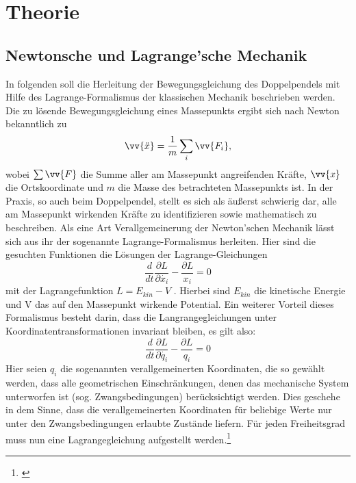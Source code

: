 \section{Theorie}
\subsection{Newtonsche und Lagrange'sche Mechanik}
In folgenden soll die Herleitung der Bewegungsgleichung des Doppelpendels mit Hilfe des Lagrange-Formalismus der klassischen Mechanik beschrieben werden. \\
Die zu lösende Bewegungsgleichung eines Massepunkts ergibt sich nach Newton bekanntlich zu \begin{equation}
\vv{\ddot{x}}=\frac{1}{m}\sum_i \vv{F_i},
\end{equation} 
wobei $ \sum \vv{F} $ die Summe aller am Massepunkt angreifenden Kräfte, $\vv{x} $ die Ortskoordinate und $ m $ die Masse des betrachteten Massepunkts ist.
In der Praxis, so auch beim Doppelpendel, stellt es sich als äußerst schwierig dar, alle am Massepunkt wirkenden Kräfte zu identifizieren sowie mathematisch zu beschreiben. Als eine Art Verallgemeinerung der Newton'schen Mechanik lässt sich aus ihr der sogenannte Lagrange-Formalismus herleiten. Hier sind die gesuchten Funktionen die Lösungen der Lagrange-Gleichungen
\begin{equation}
\frac{d}{dt}\frac{\partial L}{\partial\dot{x_i}}-\frac{\partial L}{x_i} = 0
\end{equation}
mit der Lagrangefunktion  $ L=E_{kin} - V $ . Hierbei sind $E_{kin}$ die kinetische Energie und V das auf den Massepunkt wirkende Potential. Ein weiterer Vorteil dieses Formalismus besteht darin, dass die Langrangegleichungen unter Koordinatentransformationen invariant bleiben, es gilt also:
\begin{equation}
\frac{d}{dt}\frac{\partial L}{\partial\dot{q_i}}-\frac{\partial L}{q_i} = 0
\label{lagrangegl}
\end{equation}
Hier seien $q_i$ die sogenannten verallgemeinerten Koordinaten, die so gewählt werden, dass alle geometrischen Einschränkungen, denen das mechanische System unterworfen ist (sog. Zwangsbedingungen) berücksichtigt werden. Dies geschehe in dem Sinne, dass die verallgemeinerten Koordinaten für beliebige Werte nur unter den Zwangsbedingungen erlaubte Zustände liefern. Für jeden Freiheitsgrad muss nun eine Lagrangegleichung aufgestellt werden.\footnote{\cite{sch}}
